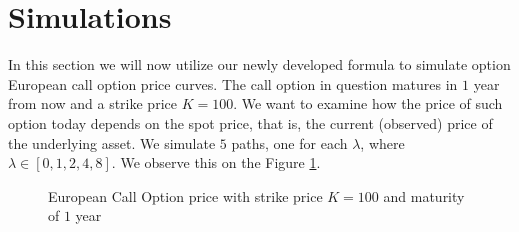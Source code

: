\documentclass[times, utf8, diplomski]{fer}
\begin{document}

\section{Simulations}


In this section we will now utilize our newly developed formula to simulate option European call option price curves. The call option in question matures in $1$ year from now and a strike price $K=100$. We want to examine how the price of such option today depends on the spot price, that is, the current (observed) price of the underlying asset. We simulate $5$ paths, one for each $\lambda$, where $\lambda \in [0,1,2,4,8]$. We observe this on the Figure \ref{fig:call_prices_different_lambdas}.

\begin{figure}[ht]
\centering

\caption{European Call Option price with strike price $K=100$ and maturity of $1$ year}
\label{fig:call_prices_different_lambdas}
\end{figure}
\end{document}
